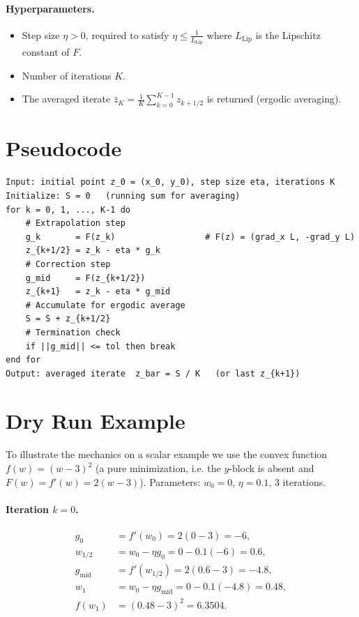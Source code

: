 \documentclass{article}
\begin{document}
\paragraph{Hyperparameters.}
\begin{itemize}
\item Step size $\eta > 0$, required to satisfy $\eta \le \tfrac{1}{L_{\mathrm{Lip}}}$
where $L_{\mathrm{Lip}}$ is the Lipschitz constant of $F$.
\item Number of iterations $K$.
\item The averaged iterate $\bar z_K = \frac{1}{K}\sum_{k=0}^{K-1} z_{k+1/2}$
is returned (ergodic averaging).
\end{itemize}

\section*{Pseudocode}
\begin{verbatim}
Input: initial point z_0 = (x_0, y_0), step size eta, iterations K
Initialize: S = 0   (running sum for averaging)
for k = 0, 1, ..., K-1 do
    # Extrapolation step
    g_k       = F(z_k)                  # F(z) = (grad_x L, -grad_y L)
    z_{k+1/2} = z_k - eta * g_k
    # Correction step
    g_mid     = F(z_{k+1/2})
    z_{k+1}   = z_k - eta * g_mid
    # Accumulate for ergodic average
    S = S + z_{k+1/2}
    # Termination check
    if ||g_mid|| <= tol then break
end for
Output: averaged iterate  z_bar = S / K   (or last z_{k+1})
\end{verbatim}

\section*{Dry Run Example}

To illustrate the mechanics on a scalar example we use the convex
function $f(w)=(w-3)^2$ (a pure minimization, i.e. the $y$-block is
absent and $F(w)=f'(w)=2(w-3)$). Parameters: $w_0=0$, $\eta=0.1$, $3$ iterations.

\paragraph{Iteration $k=0$.}
\begin{align*}
g_0 &= f'(w_0) = 2(0-3) = -6,\\
w_{1/2} &= w_0 - \eta g_0 = 0 - 0.1(-6) = 0.6,\\
g_{\text{mid}} &= f'(w_{1/2}) = 2(0.6-3) = -4.8,\\
w_1 &= w_0 - \eta g_{\text{mid}} = 0 - 0.1(-4.8) = 0.48,\\
f(w_1) &= (0.48-3)^2 = 6.3504.
\end{align*}
\end{document}
